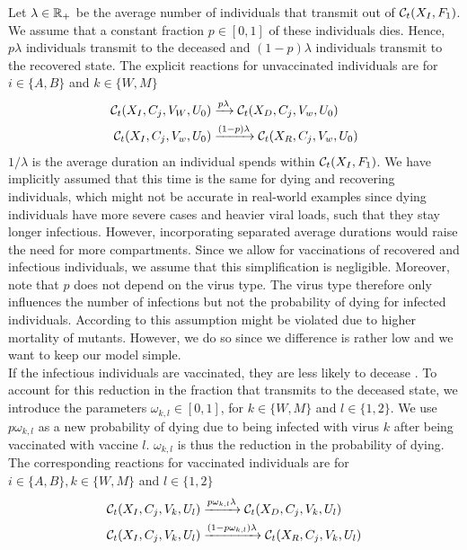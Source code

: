 Let $\lambda \in \mathbb{R}_+$ be the average number of individuals that transmit out of $\mathcal{C}_t(X_I, F_1)$. We assume that a constant fraction $p \in [0,1]$ of these individuals dies. Hence, $p\lambda$ individuals transmit to the deceased and $(1-p)\lambda$ individuals transmit to the recovered state. 
The explicit reactions for unvaccinated individuals are for $i \in \{A, B\}$ and $k \in \{W, M\}$
\begin{align}
    \mathcal{C}_t(X_I, C_j, V_W, U_0) &\xrightarrow{p \lambda} \mathcal{C}_t(X_D,C_j, V_w, U_0)  \\
    \mathcal{C}_t(X_I, C_j, V_w, U_0) &\xrightarrow{(1-p) \lambda} \mathcal{C}_t(X_R,C_j, V_w, U_0) \notag
\end{align}
$1/\lambda$ is the average duration an individual spends within $\mathcal{C}_t(X_I, F_1)$. We have implicitly assumed that this time is the same for dying and recovering individuals, which might not be accurate in real-world examples since dying individuals have more severe cases and heavier viral loads, such that they stay longer infectious. However, incorporating separated average durations would raise the need for more compartments. Since we allow for vaccinations of recovered and infectious individuals, we assume that this simplification is negligible. Moreover, note that $p$ does not depend on the virus type. The virus type therefore only influences the number of infections but not the probability of dying for infected individuals. According to \cite{Davies.2021} this assumption might be violated due to higher mortality of mutants. However, we do so since we difference is rather low and we want to keep our model simple. \\


If the infectious individuals are vaccinated, they are less likely to decease \citep{Tenforde.2021, Voysey.2021}. To account for this reduction in the fraction that transmits to the deceased state, we introduce the parameters $\omega_{k,l} \in [0,1]$, for $k \in \{W, M\}$ and $l \in \{1,2\}$. We use $p \omega_{k,l}$ as a new probability of dying due to being infected with virus $k$ after being vaccinated with vaccine $l$. $\omega_{k,l}$ is thus the reduction in the probability of dying. The corresponding reactions for vaccinated individuals are for $i \in \{A, B\}, k \in \{W, M\}$ and $l \in \{1,2\}$
\begin{align}
    \mathcal{C}_t(X_I, C_j, V_k, U_l) &\xrightarrow{p \omega_{k,l} \lambda} \mathcal{C}_t(X_D,C_j, V_k, U_l) \\
    \mathcal{C}_t(X_I, C_j, V_k, U_l) &\xrightarrow{(1-p \omega_{k,l}) \lambda} \mathcal{C}_t(X_R,C_j, V_k, U_l) \notag
\end{align}

